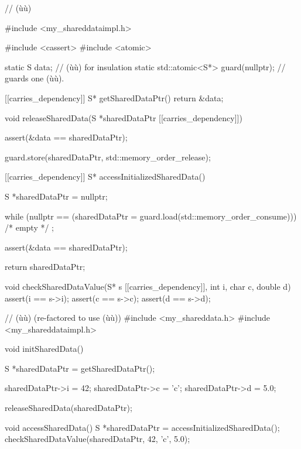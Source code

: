 \begin{emcppslisting}
// (ù{}ù)

#include <my_shareddataimpl.h>

#include <cassert>
#include <atomic>

static S               data;           // (ù{}ù) for insulation
static std::atomic<S*> guard(nullptr); // guards one (ù{}ù).

[[carries_dependency]] S* getSharedDataPtr()
{
    return &data;
}

void releaseSharedData(S *sharedDataPtr [[carries_dependency]])
{
    assert(&data == sharedDataPtr);

    guard.store(sharedDataPtr, std::memory_order_release);
}

[[carries_dependency]] S* accessInitializedSharedData()
{
    S *sharedDataPtr = nullptr;

    while (nullptr == (sharedDataPtr = guard.load(std::memory_order_consume)))
        /* empty */ ;

    assert(&data == sharedDataPtr);

    return sharedDataPtr;
}

void checkSharedDataValue(S*     s [[carries_dependency]],
                          int    i,
                          char   c,
                          double d)
{
    assert(i == s->i);
    assert(c == s->c);
    assert(d == s->d);
}
\end{emcppslisting}
\newpage%
\begin{emcppslisting}
// (ù{}ù) (re-factored to use (ù{}ù))
#include <my_shareddata.h>
#include <my_shareddataimpl.h>

void initSharedData()
{
    S *sharedDataPtr = getSharedDataPtr();

    sharedDataPtr->i = 42;
    sharedDataPtr->c = 'c';
    sharedDataPtr->d = 5.0;

    releaseSharedData(sharedDataPtr);
}

void accessSharedData()
{
    S *sharedDataPtr = accessInitializedSharedData();
    checkSharedDataValue(sharedDataPtr, 42, 'c', 5.0);
}
\end{emcppslisting}




